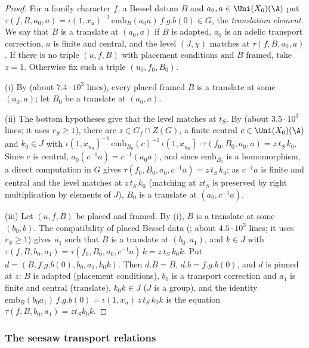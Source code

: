 \begin{proof}
For a family character $f$, a Bessel datum $B$ and $a_0,a\in\Uni(X_0)(\A)$ put
$\tau(f,B,a_0,a)=\iota(1,x_u)^{-1}\,\mathrm{emb}_B(a_0a)\,f.g.b(0)\in G$, the \emph{translation element}. We say that $B$
is a translate at $(a_0,a)$ if $B$ is adapted, $a_0$ is an adelic transport correction, $a$ is finite and central, and the
level $(J,\chi)$ matches at $\tau(f,B,a_0,a)$. If there is no triple $(u,f,B)$ with placement conditions and $B$ framed,
take $z=1$. Otherwise fix such a triple $(u_0,f_0,B_0)$.

(i) By  (about $7.4\cdot10^3$ lines), every placed framed $B$ is a
translate at some $(a_0,a)$; let $B_0$ be a translate at $(a_0,a)$.

(ii) The bottom hypotheses give that the level matches at $t_S$. By
 (about $3.5\cdot10^3$ lines; it uses $r_S\ge1$), there are
$z\in G_f\cap Z(G)$, a finite central $c\in\Uni(X_0)(\A)$ and $k_0\in J$ with
$\iota(1,x_{u_0})^{-1}\,\mathrm{emb}_{B_0}(c)^{-1}\,\iota(1,x_{u_0})\cdot\tau(f_0,B_0,a_0,a)=z\,t_S\,k_0$. Since $c$ is
central, $a_0(c^{-1}a)=c^{-1}(a_0a)$, and since $\mathrm{emb}_{B_0}$ is a homomorphism, a direct computation in $G$ gives
$\tau(f_0,B_0,a_0,c^{-1}a)=z\,t_S\,k_0$; as $c^{-1}a$ is finite and central and the level matches at $z\,t_S\,k_0$
(matching at $zt_S$ is preserved by right multiplication by elements of $J$), $B_0$ is a translate at $(a_0,c^{-1}a)$.

(iii) Let $(u,f,B)$ be placed and framed. By (i), $B$ is a translate at some $(b_0,b)$. The compatibility of placed Bessel
data (; about $4.5\cdot10^3$ lines; it uses $r_S\ge1$) gives
$a_1$ such that $B$ is a translate at $(b_0,a_1)$, and $k\in J$ with
$\tau(f,B,b_0,a_1)=\tau(f_0,B_0,a_0,c^{-1}a)\,k=z\,t_S\,k_0k$. Put $d=(B,f.g.b(0),b_0,a_1,k_0k)$. Then $d.B=B$,
$d.b=f.g.b(0)$, and $d$ is pinned at $z$: $B$ is adapted (placement conditions), $b_0$ is a transport correction and $a_1$
is finite and central (translate), $k_0k\in J$ ($J$ is a group), and the identity
$\mathrm{emb}_B(b_0a_1)\,f.g.b(0)=\iota(1,x_u)\,z\,t_S\,k_0k$ is the equation $\tau(f,B,b_0,a_1)=zt_Sk_0k$.
\end{proof}

\subsubsection{The seesaw transport relations}

